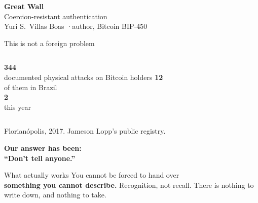 \documentclass[aspectratio=169,12pt]{beamer}
\newcommand{\regTotal}{344}
\newcommand{\regBrazil}{12}
\newcommand{\regBrazilThisYear}{2}
\newcommand{\huger}[1]{{\fontsize{56}{60}\selectfont\bfseries #1}}
\newcommand{\bignum}[1]{{\fontsize{34}{38}\selectfont\bfseries #1}}
\newcommand{\quiet}[1]{{\color{muted}#1}}
\begin{document}
\begin{frame}[plain]
  \vfill
  \centering
  {\fontsize{44}{48}\selectfont\bfseries Great Wall}\\[0.5cm]
  {\Large Coercion-resistant authentication}\\[1.2cm]
  \quiet{Yuri S.\ Villas Boas \quad·\quad author, Bitcoin BIP-450}
  \vfill
\end{frame}

\begin{frame}[t]{This is not a foreign problem}
  \vspace{0.6cm}
  \begin{columns}[T]
      \huger{\regTotal}\\[0.2cm]
      documented physical attacks on Bitcoin holders
      \huger{\regBrazil}\\[0.2cm]
      of them in Brazil\\[0.6cm]
      \bignum{\regBrazilThisYear}\\[0.2cm]
      this year
  \end{columns}
  \vfill
  \quiet{Florianópolis, 2017. Jameson Lopp's public registry.}
\end{frame}

\begin{frame}[plain]
  \vfill\centering
  {\fontsize{40}{46}\selectfont\bfseries Our answer has been:}\\[0.8cm]
  {\fontsize{40}{46}\selectfont\bfseries\color{accent}``Don't tell anyone.''}
  \vfill
\end{frame}

\begin{frame}[t]{What actually works}
  \vspace{1.2cm}
  \centering
  {\fontsize{30}{36}\selectfont You cannot be forced to hand over\\[0.3cm]
   \textbf{something you cannot describe.}}
  \vfill
  \quiet{Recognition, not recall. There is nothing to write down, and nothing to take.}
\end{frame}
\end{document}
